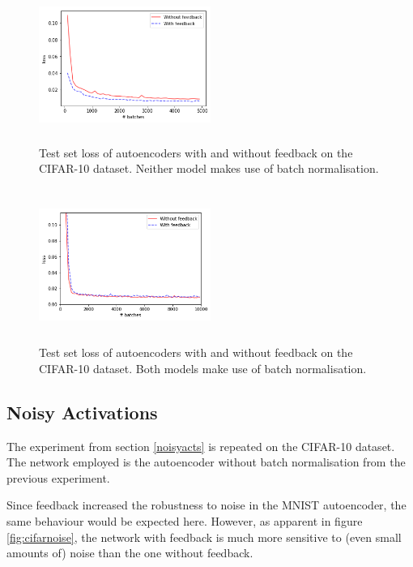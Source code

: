 \documentclass{article}
\begin{document}
\begin{figure}
      \centering
      \includegraphics[width=0.5\textwidth,height=5cm,keepaspectratio]{img/cifar_auto_test_loss.png}
      \caption{Test set loss of autoencoders with and without feedback on the CIFAR-10 dataset. Neither model makes use of batch normalisation. }
      \label{fig:cifarauto}
  \end{figure}
  
  \begin{figure}
      \centering
      \includegraphics[width=0.5\textwidth,height=5cm,keepaspectratio]{img/cifar_auto_batch_test_loss.png}
      \caption{Test set loss of autoencoders with and without feedback on the CIFAR-10 dataset. Both models make use of batch normalisation. }
      \label{fig:cifarautobatch}
  \end{figure}

\subsection{Noisy Activations}
The experiment from section \ref{noisyacts} is repeated on the CIFAR-10 dataset. The network employed is the autoencoder without batch normalisation from the previous experiment. 

Since feedback increased the robustness to noise in the MNIST autoencoder, the same behaviour would be expected here. However, as apparent in figure \ref{fig:cifarnoise}, the network with feedback is much more sensitive to (even small amounts of) noise than the one without feedback. 
\end{document}
